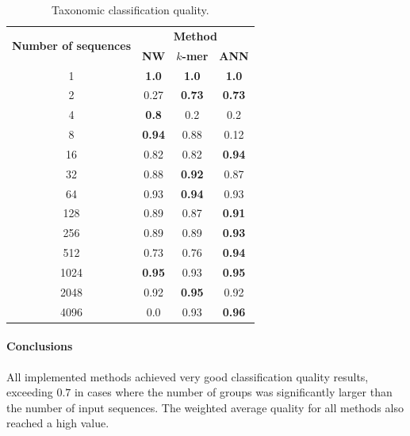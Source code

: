 \documentclass[pdflatex,sn-vancouver-num]{sn-jnl}%
\begin{document}
                \begin{table}\centering
                    \caption{Taxonomic classification quality.}\label{Table:Experiment:Quality}

                    \begin{tabular}{|c|c|c|c|}
                        \hline
                        \multirow{2}{*}{\textbf{Number of sequences}} & \multicolumn{3}{|c|}{\textbf{Method}} \\
                        & \textbf{NW} & \textbf{$k$-mer} & \textbf{ANN} \\ \hline \hline
                        1 & \textbf{1.0} & \textbf{1.0} & \textbf{1.0}\\ \hline
                        2 & 0.27 & \textbf{0.73} & \textbf{0.73}\\ \hline
                        4 & \textbf{0.8} & 0.2 & 0.2\\ \hline
                        8 & \textbf{0.94} & 0.88 & 0.12\\ \hline
                        16 & 0.82 & 0.82 & \textbf{0.94}\\ \hline
                        32 & 0.88 & \textbf{0.92} & 0.87\\ \hline
                        64 & 0.93 & \textbf{0.94} & 0.93\\ \hline
                        128 & 0.89 & 0.87 & \textbf{0.91}\\ \hline
                        256 & 0.89 & 0.89 & \textbf{0.93}\\ \hline
                        512 & 0.73 & 0.76 & \textbf{0.94}\\ \hline
                        1024 & \textbf{0.95} & 0.93 & \textbf{0.95}\\ \hline
                        2048 & 0.92 & \textbf{0.95} & 0.92\\ \hline
                        4096 & 0.0 & 0.93 & \textbf{0.96}\\ \hline
                    \end{tabular}
                \end{table}

                \paragraph{Conclusions}
                All implemented methods achieved very good classification quality results, exceeding $0.7$ in cases where the number of groups was significantly larger than the number of input sequences. The weighted average quality for all methods also reached a high value.
\end{document}

